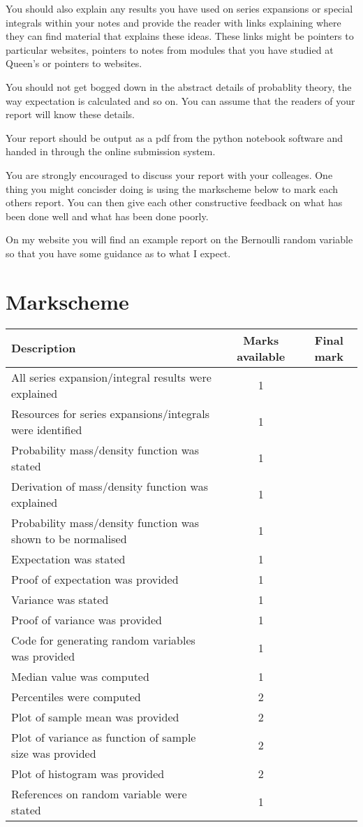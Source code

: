\documentclass[paper=a4, fontsize=11pt]{scrartcl}
\numberwithin{equation}{section}
\numberwithin{figure}{section}
\numberwithin{table}{section}
\begin{document}
You should also explain any results you have used on series expansions or special integrals within your notes and provide the reader with links explaining where they can find material that explains 
these ideas.  These links might be pointers to particular websites, pointers to notes from modules that you have studied at Queen's or pointers to websites.

You should not get bogged down in the abstract details of probablity theory, the way expectation is calculated and so on.  You can assume that the readers of your report will know these details.

Your report should be output as a pdf from the python notebook software and handed in through the online submission system.

You are strongly encouraged to discuss your report with your colleages.  One thing you might concisder doing is using the markscheme below to mark each others report.  You can then give each other 
constructive feedback on what has been done well and what has been done poorly.

On my website you will find an example report on the Bernoulli random variable so that you have some guidance as to what I expect.

\section{Markscheme}

\begin{center}
\begin{tabular}{ l | c | c }
Description & Marks available & Final mark \\ \hline
All series expansion/integral results were explained & 1 &  \\
Resources for series expansions/integrals were identified & 1 & \\
Probability mass/density function was stated & 1 & \\
Derivation of mass/density function was explained & 1 & \\
Probability mass/density function was shown to be normalised & 1 & \\
Expectation was stated & 1 & \\
Proof of expectation was provided & 1 & \\
Variance was stated & 1 & \\
Proof of variance was provided & 1 &  \\
Code for generating random variables was provided & 1 & \\
Median value was computed & 1 & \\ 
Percentiles were computed & 2 & \\ 
Plot of sample mean was provided & 2 & \\
Plot of variance as function of sample size was provided & 2 & \\
Plot of histogram was provided & 2 & \\
References on random variable were stated & 1 &
\end{tabular}
\end{center}
\end{document}
